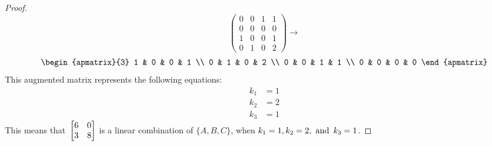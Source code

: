 \documentclass{article}
\begin{document}
\begin{enumerate}
\begin{proof}
\[            \begin{pmatrix}
                0 & 0 & 1 & 1 \\
                0 & 0 & 0 & 0 \\
                1 & 0 & 0 & 1 \\
                0 & 1 & 0 & 2
            \end{pmatrix} \rightarrow
        \]
        \[
            \begin{apmatrix}{3}
                1 & 0 & 0 & 1 \\
                0 & 1 & 0 & 2 \\
                0 & 0 & 1 & 1 \\
                0 & 0 & 0 & 0
            \end{apmatrix}
        \]
        This augmented matrix represents the following equations:
        \begin{align*}
            k_1 & = 1 \\
            k_2 & = 2 \\
            k_3 & = 1
        \end{align*}
        This means that $\operatorname{\displaystyle} \begin{bmatrix} 6 & 0 \\ 3 & 8 \end{bmatrix}$ is a linear combination of $\{A,B,C\}$, when $k_1 = 1, k_2 = 2, \operatorname{~\text{and}~} k_3 = 1$.
    \end{proof}

\end{enumerate}
\end{document}
